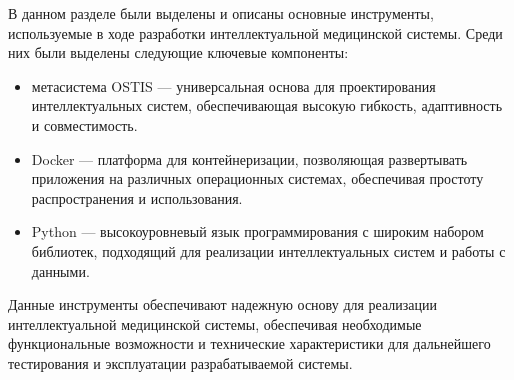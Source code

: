 В данном разделе были выделены и описаны основные инструменты, используемые в ходе разработки интеллектуальной медицинской системы. Среди них были выделены следующие ключевые компоненты:

\begin{itemize}
    \item метасистема OSTIS — универсальная основа для проектирования интеллектуальных систем, обеспечивающая высокую гибкость, адаптивность и совместимость.
    \item Docker — платформа для контейнеризации, позволяющая развертывать приложения на различных операционных системах, обеспечивая простоту распространения и использования.
    \item Python — высокоуровневый язык программирования с широким набором библиотек, подходящий для реализации интеллектуальных систем и работы с данными.
\end{itemize}

Данные инструменты обеспечивают надежную основу для реализации интеллектуальной медицинской системы, обеспечивая необходимые функциональные возможности и технические характеристики для дальнейшего тестирования и эксплуатации разрабатываемой системы.

